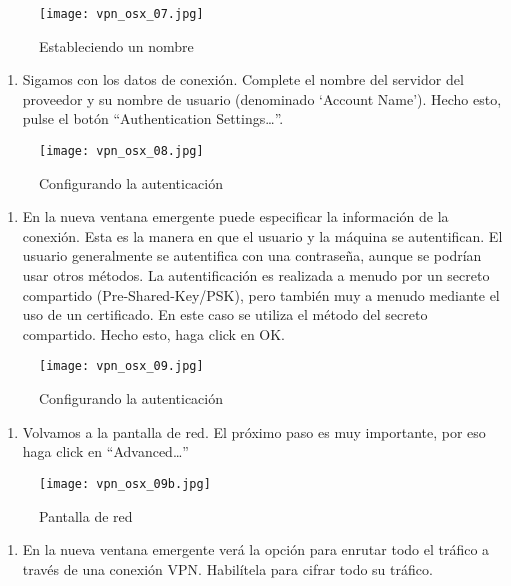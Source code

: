 \documentclass[10pt,a5paper,twoside,,]{book}
\providecommand{\tightlist}{%
  \setlength{\itemsep}{0pt}\setlength{\parskip}{0pt}}
\begin{document}
\begin{figure}[htbp]
\centering
\texttt{[image: vpn\_osx\_07.jpg]}
\caption{Estableciendo un nombre}
\end{figure}

\begin{enumerate}
\def\labelenumi{\arabic{enumi}.}
\setcounter{enumi}{7}
\tightlist
\item
  Sigamos con los datos de conexión. Complete el nombre del servidor del
  proveedor y su nombre de usuario (denominado `Account Name'). Hecho
  esto, pulse el botón ``Authentication Settings\ldots{}''.
\end{enumerate}

\begin{figure}[htbp]
\centering
\texttt{[image: vpn\_osx\_08.jpg]}
\caption{Configurando la autenticación}
\end{figure}

\begin{enumerate}
\def\labelenumi{\arabic{enumi}.}
\setcounter{enumi}{8}
\tightlist
\item
  En la nueva ventana emergente puede especificar la información de la
  conexión. Esta es la manera en que el usuario y la máquina se
  autentifican. El usuario generalmente se autentifica con una
  contraseña, aunque se podrían usar otros métodos. La autentificación
  es realizada a menudo por un secreto compartido (Pre-Shared-Key/PSK),
  pero también muy a menudo mediante el uso de un certificado. En este
  caso se utiliza el método del secreto compartido. Hecho esto, haga
  click en OK.
\end{enumerate}

\begin{figure}[htbp]
\centering
\texttt{[image: vpn\_osx\_09.jpg]}
\caption{Configurando la autenticación}
\end{figure}

\begin{enumerate}
\def\labelenumi{\arabic{enumi}.}
\setcounter{enumi}{9}
\tightlist
\item
  Volvamos a la pantalla de red. El próximo paso es muy importante, por
  eso haga click en ``Advanced\ldots{}''
\end{enumerate}

\begin{figure}[htbp]
\centering
\texttt{[image: vpn\_osx\_09b.jpg]}
\caption{Pantalla de red}
\end{figure}

\begin{enumerate}
\def\labelenumi{\arabic{enumi}.}
\setcounter{enumi}{10}
\tightlist
\item
  En la nueva ventana emergente verá la opción para enrutar todo el
  tráfico a través de una conexión VPN. Habilítela para cifrar todo su
  tráfico.
\end{enumerate}
\end{document}
